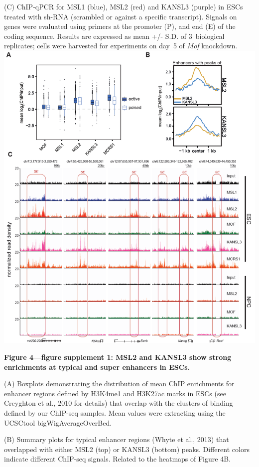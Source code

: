 \begin{footnotesize}
\begin{sffamily}
\begin{singlespacing}
(C) ChIP-qPCR for MSL1 (blue), MSL2 (red) and KANSL3 (purple) in ESCs treated with sh-RNA (scrambled or against a specific transcript). Signals on genes were evaluated using primers at the promoter (P), and end (E) of the coding sequence. Results are expressed as mean +/- S.D. of 3~bio\-lo\-gi\-cal replicates; cells were harvested for experiments on day~5 of \textit{Mof} knockdown.
\newpage
\includegraphics[width=\textwidth]{Figures/Appendix/Figure4_supplemental_figure1_scissored.pdf}

\textbf{Figure 4—figure supplement 1: MSL2 and KANSL3 show strong enrichments at typical and super enhancers in ESCs.}

(A) Boxplots demonstrating the distribution of mean ChIP enrichments for enhancer regions defined by H3K4me1 and H3K27ac marks in ESCs (see Creyghton et al., 2010 for details) that overlap with the clusters of binding defined by our ChIP-seq samples. Mean values were extracting using the UCSCtool bigWigAverageOverBed.

(B) Summary plots for typical enhancer regions (Whyte et al., 2013) that overlapped with either MSL2 (top) or KANSL3 (bottom) peaks. Different colors indicate different ChIP-seq signals. Related to the heatmaps of Figure 4B.


\end{singlespacing}
\end{sffamily}
\end{footnotesize}
